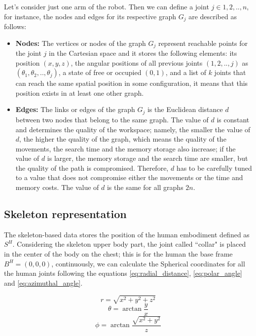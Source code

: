 \documentclass[thesis]{mas_proposal}
\begin{document}
Let's consider just one arm of the robot. Then we can define a joint $j \in {1,2,..,n}$, for instance, the nodes and edges for its respective graph $G_j$ are described as follows:

\begin{itemize}
	
	\item \textbf{Nodes:} The vertices or nodes of the graph $G_j$ represent reachable points for the joint $j$ in the Cartesian space and it stores the following elements: its position $(x, y, z)$, the angular positions of all previous joints $(1,2,..,j)$ as $(\theta_1, \theta_2,..,\theta_j)$, a state of free or occupied $(0, 1)$, and a list of $k$ joints that can reach the same spatial position in some configuration, it means that this position exists in at least one other graph. 	
	
	\item \textbf{Edges:} The links or edges of the graph $G_j$ is the Euclidean distance $d$ between two nodes that belong to the same graph. The value of $d$ is constant and determines the quality of the workspace; namely, the smaller the value of $d$, the higher the quality of the graph, which means the quality of the movements, the search time and the memory storage also increase; if the value of $d$ is larger, the memory storage and the search time are smaller, but the quality of the path is compromised. Therefore, $d$ has to be carefully tuned to a value that does not compromise either the movements or the time and memory costs. The value of $d$ is the same for all graphs $2n$.
	
\end{itemize}  

\subsection{Skeleton representation}
	The skeleton-based data stores the position of the human embodiment defined as $S^H$. Considering the skeleton upper body part, the joint called ``collar" is placed in the center of the body on the chest; this is for the human the base frame $B^H = (0, 0, 0)$, continuously, we can calculate the Spherical coordinates for all the human joints following the equations \ref{eq:radial_distance}, \ref{eq:polar_angle} and \ref{eq:azimuthal_angle}.

\begin{equation}
	r = \sqrt{x^2 + y^2 + z^2}
	\label{eq:radial_distance}
	\end{equation}
	\begin{equation}
	\theta = \arctan \frac{y}{x}
	\label{eq:polar_angle}
	\end{equation}
	\begin{equation}
	\phi = \arctan \frac{\sqrt{x^2 + y^2}}{z}
	\label{eq:azimuthal_angle}
\end{equation}
\end{document}
